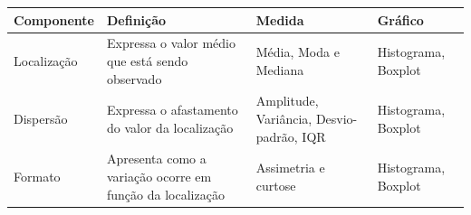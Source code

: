 \documentclass[
]{book}
\begin{document}
\begin{longtable}[]{@{}llll@{}}
\toprule
\begin{minipage}[b]{0.22\columnwidth}\raggedright
Componente\strut
\end{minipage} & \begin{minipage}[b]{0.22\columnwidth}\raggedright
Definição\strut
\end{minipage} & \begin{minipage}[b]{0.22\columnwidth}\raggedright
Medida\strut
\end{minipage} & \begin{minipage}[b]{0.22\columnwidth}\raggedright
Gráfico\strut
\end{minipage}\tabularnewline
\midrule
\endhead
\begin{minipage}[t]{0.22\columnwidth}\raggedright
Localização\strut
\end{minipage} & \begin{minipage}[t]{0.22\columnwidth}\raggedright
Expressa o valor médio que está sendo observado\strut
\end{minipage} & \begin{minipage}[t]{0.22\columnwidth}\raggedright
Média, Moda e Mediana\strut
\end{minipage} & \begin{minipage}[t]{0.22\columnwidth}\raggedright
Histograma, Boxplot\strut
\end{minipage}\tabularnewline
\begin{minipage}[t]{0.22\columnwidth}\raggedright
Dispersão\strut
\end{minipage} & \begin{minipage}[t]{0.22\columnwidth}\raggedright
Expressa o afastamento do valor da localização\strut
\end{minipage} & \begin{minipage}[t]{0.22\columnwidth}\raggedright
Amplitude, Variância, Desvio-padrão, IQR\strut
\end{minipage} & \begin{minipage}[t]{0.22\columnwidth}\raggedright
Histograma, Boxplot\strut
\end{minipage}\tabularnewline
\begin{minipage}[t]{0.22\columnwidth}\raggedright
Formato\strut
\end{minipage} & \begin{minipage}[t]{0.22\columnwidth}\raggedright
Apresenta como a variação ocorre em função da localização\strut
\end{minipage} & \begin{minipage}[t]{0.22\columnwidth}\raggedright
Assimetria e curtose\strut
\end{minipage} & \begin{minipage}[t]{0.22\columnwidth}\raggedright
Histograma, Boxplot\strut
\end{minipage}\tabularnewline
\bottomrule
\end{longtable}
\end{document}
